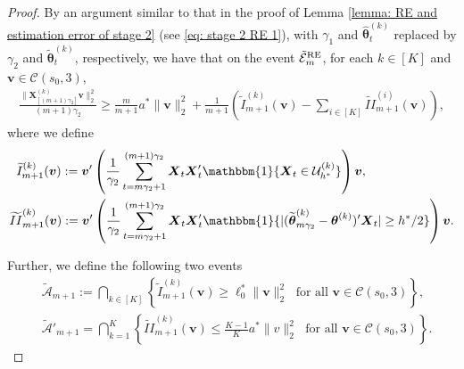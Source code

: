\documentclass[aos,preprint]{imsart}
\theoremstyle{plain}
\theoremstyle{definition}
\newcommand{\btheta}{\boldsymbol{\theta}}
\newcommand{\hbtheta}{\widehat{\boldsymbol{\theta}}}
\newcommand{\idf}{\mathbbm{1}}
\newcommand{\bX}{\boldsymbol{X}}
\newcommand{\tbtheta}{\widetilde{\boldsymbol{\theta}}}
\newcommand{\mC}{\mathcal{C}}
\newcommand{\bv}{\boldsymbol{v}}
\newcommand{\mE}{\mathcal{E}}
\begin{document}
\begin{appendix}
\begin{proof}
By an argument similar to that in the proof of Lemma \ref{lemma: RE and estimation error of stage 2} (see \eqref{eq: stage 2 RE 1}), with $\gamma_1$ and $\hbtheta_t^{(k)}$ replaced by $\gamma_2$ and $\tbtheta_t^{(k)}$, respectively, we have that on the event $\tilde{\mE}_{m}^{\textup{RE}}$, for each $k \in [K]$ and $\bv\in \mC(s_0,3)$,
\begin{equation*}
\begin{aligned}
   \frac{\|\bX_{[(m+1)\gamma_2]}^{(k)} \bv\|_2^2}{(m+1)\gamma_2} \geq \frac{m}{m+1} a^*\|\bv\|_2^2 + \frac{1}{m+1} \left(\widetilde{I}_{m+1}^{(k)}(\bv) - \sum_{i \in [K]} \widetilde{II}_{m+1}^{(i)}(\bv) \right), 
\end{aligned}
\end{equation*}
where we define 
\begin{equation*} 
\begin{aligned}
\begin{aligned}
& \;\; \widetilde{I}_{m+1}^{(k)}(\bv)  :=  \bv'\left(\frac{1}{\gamma_2}\sum_{t=m\gamma_2+1}^{(m+1)\gamma_2} \bX_t\bX_t'\idf\{\bX_t\in \mathcal{U}_{h^*}^{(k)}\} \right) \bv, \\
    &\widetilde{II}_{m+1}^{(k)}(\bv) :=   \bv'\left(\frac{1}{\gamma_2}\sum_{t=m\gamma_2+1}^{(m+1)\gamma_2} \bX_t\bX_t'\idf\{|(\tbtheta_{m\gamma_2}^{(k)}-\btheta^{(k)})'\bX_t|\ge h^*/2\} \right) \bv.
\end{aligned}
\end{aligned}
\end{equation*}

Further, we define the following two events
\begin{align*}
 &\widetilde{\mathcal{A}}_{m+1} := \bigcap_{k \in [K]} \left\{ \widetilde{I}_{m+1}^{(k)}(\bv) \geq \ell_0^* \|\bv\|_2^2 \; \text{ for all } 
\bv\in \mathcal{C}(s_0,3)\right\},\\
& \widetilde{\mathcal{A}}'_{m+1}=\bigcap_{k = 1}^{K}\left\{ \widetilde{II}_{m+1}^{(k)}(\bv) \leq  \frac{K-1}{K} a^*\|v\|_2^2\; \text{ for all } 
\bv\in \mathcal{C}(s_0,3)
\right\}.
\end{align*}


\end{proof}
\end{appendix}
\end{document}
